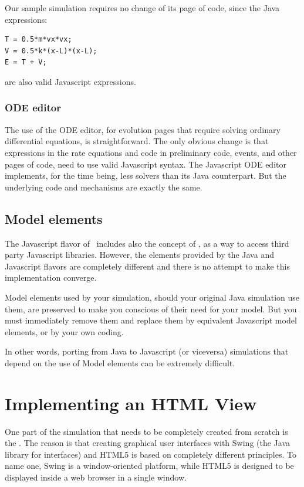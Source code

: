 Our sample simulation requires no change of its  page of code, since the Java expressions:
\begin{verbatim}
T = 0.5*m*vx*vx;
V = 0.5*k*(x-L)*(x-L);
E = T + V;
\end{verbatim}
\noindent are also valid Javascript expressions.

\subsubsection*{ODE editor}

The use of the ODE editor, for evolution pages that require solving ordinary differential equations, is straightforward. The only obvious change is that expressions in the rate equations and code in preliminary code, events, and other pages of code, need to use valid Javascript syntax. The Javascript ODE editor implements, for the time being, less solvers than its Java counterpart. But the underlying code and mechanisms are exactly the same.

\subsection{Model elements}

The Javascript flavor of \ejs\ includes also the concept of , as a way to access third party Javascript libraries. However, the elements provided by the Java and Javascript flavors are completely different and there is no attempt to make this implementation converge.

Model elements used by your simulation, should your original Java simulation use them, are preserved to make you conscious of their need for your model. But you must immediately remove them and replace them by equivalent Javascript model elements, or by your own coding.

In other words, porting from Java to Javascript (or viceversa) simulations that depend on the use of Model elements can be extremely difficult.

    \section{Implementing an HTML View}\label{section:04View}

One part of the simulation that needs to be completely created from scratch is the . The reason is that creating graphical user interfaces with Swing (the Java library for interfaces) and HTML5 is based on completely different principles. To name one, Swing is a window-oriented platform, while HTML5 is designed to be displayed inside a web browser in a single window.

